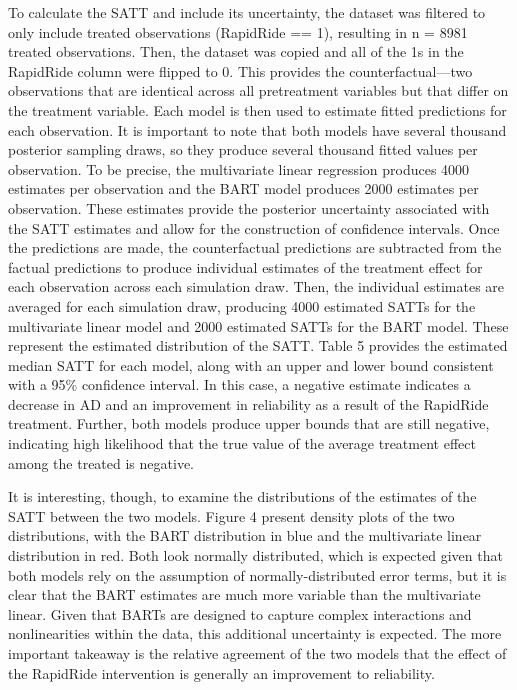 \documentclass[
  12pt,
]{article}
\begin{document}
To calculate the SATT and include its uncertainty, the dataset was
filtered to only include treated observations (RapidRide == 1),
resulting in n = 8981 treated observations. Then, the dataset was copied
and all of the 1s in the RapidRide column were flipped to 0. This
provides the counterfactual---two observations that are identical across
all pretreatment variables but that differ on the treatment variable.
Each model is then used to estimate fitted predictions for each
observation. It is important to note that both models have several
thousand posterior sampling draws, so they produce several thousand
fitted values per observation. To be precise, the multivariate linear
regression produces 4000 estimates per observation and the BART model
produces 2000 estimates per observation. These estimates provide the
posterior uncertainty associated with the SATT estimates and allow for
the construction of confidence intervals. Once the predictions are made,
the counterfactual predictions are subtracted from the factual
predictions to produce individual estimates of the treatment effect for
each observation across each simulation draw. Then, the individual
estimates are averaged for each simulation draw, producing 4000
estimated SATTs for the multivariate linear model and 2000 estimated
SATTs for the BART model. These represent the estimated distribution of
the SATT. Table 5 provides the estimated median SATT for each model,
along with an upper and lower bound consistent with a 95\% confidence
interval. In this case, a negative estimate indicates a decrease in AD
and an improvement in reliability as a result of the RapidRide
treatment. Further, both models produce upper bounds that are still
negative, indicating high likelihood that the true value of the average
treatment effect among the treated is negative.

It is interesting, though, to examine the distributions of the estimates
of the SATT between the two models. Figure 4 present density plots of
the two distributions, with the BART distribution in blue and the
multivariate linear distribution in red. Both look normally distributed,
which is expected given that both models rely on the assumption of
normally-distributed error terms, but it is clear that the BART
estimates are much more variable than the multivariate linear. Given
that BARTs are designed to capture complex interactions and
nonlinearities within the data, this additional uncertainty is expected.
The more important takeaway is the relative agreement of the two models
that the effect of the RapidRide intervention is generally an
improvement to reliability.
\end{document}
